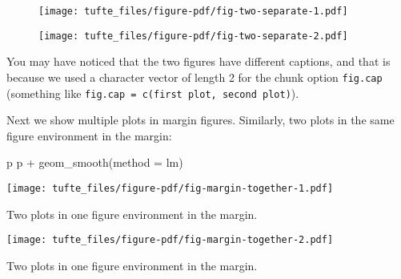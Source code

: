 \documentclass[
  letterpaper,
  DIV=11,
  numbers=noendperiod,
  oneside]{scrartcl}
\newenvironment{Shaded}{\begin{snugshade}}{\end{snugshade}}
\newcommand{\AttributeTok}[1]{\textcolor[rgb]{0.40,0.45,0.13}{#1}}
\newcommand{\FunctionTok}[1]{\textcolor[rgb]{0.28,0.35,0.67}{#1}}
\newcommand{\NormalTok}[1]{\textcolor[rgb]{0.00,0.23,0.31}{#1}}
\newcommand{\SpecialCharTok}[1]{\textcolor[rgb]{0.37,0.37,0.37}{#1}}
\newcommand{\StringTok}[1]{\textcolor[rgb]{0.13,0.47,0.30}{#1}}
\begin{document}
\begin{figure}[H]


{\centering \texttt{[image: tufte\_files/figure-pdf/fig-two-separate-1.pdf]}

}

\end{figure}

\begin{figure}[H]


{\centering \texttt{[image: tufte\_files/figure-pdf/fig-two-separate-2.pdf]}

}

\end{figure}

You may have noticed that the two figures have different captions, and
that is because we used a character vector of length 2 for the chunk
option \texttt{fig.cap} (something like
\texttt{fig.cap\ =\ c(\textquotesingle{}first\ plot\textquotesingle{},\ \textquotesingle{}second\ plot\textquotesingle{})}).

Next we show multiple plots in margin figures. Similarly, two plots in
the same figure environment in the margin:

\begin{Shaded}
\begin{Highlighting}[]
\NormalTok{p}
\NormalTok{p }\SpecialCharTok{+} \FunctionTok{geom\_smooth}\NormalTok{(}\AttributeTok{method =} \StringTok{\textquotesingle{}lm\textquotesingle{}}\NormalTok{)}
\end{Highlighting}
\end{Shaded}

\begin{marginfigure}

{\centering \texttt{[image: tufte\_files/figure-pdf/fig-margin-together-1.pdf]}

}

\caption{\label{fig-margin-together-1}Two plots in one figure
environment in the margin.}

\end{marginfigure}

\begin{marginfigure}

{\centering \texttt{[image: tufte\_files/figure-pdf/fig-margin-together-2.pdf]}

}

\caption{\label{fig-margin-together-2}Two plots in one figure
environment in the margin.}

\end{marginfigure}
\end{document}
